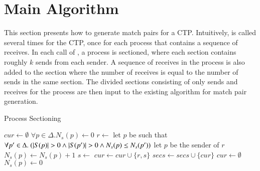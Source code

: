 \section{Main Algorithm}


This section presents how to generate match pairs for a CTP. 
Intuitively,  is called several times for the CTP, once for each process that contains a sequence of receives. 
In each call of , a process is sectioned, where each section contains roughly $k$ sends from each sender. A sequence of receives in the process is also added to the section where the number of receives is equal to the number of sends in the same section.
The divided sections consisting of only sends and receives for the process are then input to the existing algorithm for match pair generation. 



\begin{algorithm}
\caption{Process Sectioning}\label{algo:main}
\begin{algorithmic}[1]
\State $\mathit{cur}\gets\emptyset$
\State $\forall p \in \Delta. N_s(p)\gets 0$
\State $r \gets$ 
\State let $p$ be such that $\forall p^\prime \in \Delta.\ (|S(p)|>0  \wedge |S(p^\prime)|>0  \wedge \Call{$N_s$}{p}\le \Call{$N_s$}{p^\prime} )$
\Else 
\State let $p$ be the sender of $r$
\EndIf
\State $N_s(p)\gets N_s(p)+1$
\State $s\gets$ 
\State $\mathit{cur}\gets \mathit{cur}\cup \{r,s\}$
\State $\mathit{secs}\gets\mathit{secs}\cup\{\mathit{cur}\}$
\State $\mathit{cur}\gets\emptyset$
\State $N_s(p)\gets 0$
\EndFor
\EndIf
\EndWhile
\end{algorithmic}
\end{algorithm}



